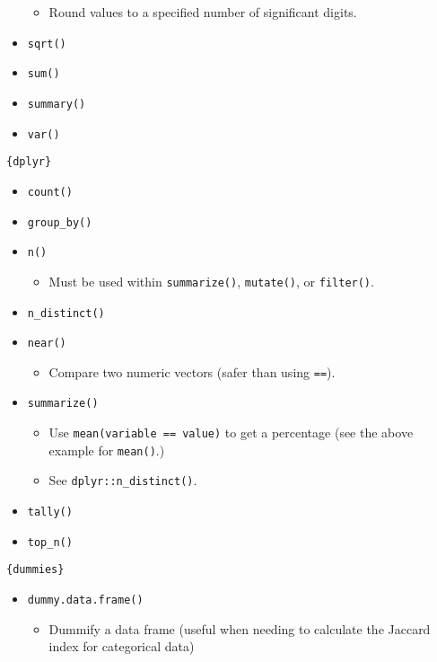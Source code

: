 \documentclass[
]{book}
\providecommand{\tightlist}{%
  \setlength{\itemsep}{0pt}\setlength{\parskip}{0pt}}
\begin{document}
\begin{itemize}
  \begin{itemize}
  \tightlist
  \item
    Round values to a specified number of significant digits.
  \end{itemize}
\item
  \texttt{sqrt()}
\item
  \texttt{sum()}
\item
  \texttt{summary()}
\item
  \texttt{var()}
\end{itemize}

\texttt{\{dplyr\}}

\begin{itemize}
\tightlist
\item
  \texttt{count()}
\item
  \texttt{group\_by()}
\item
  \texttt{n()}

  \begin{itemize}
  \tightlist
  \item
    Must be used within \texttt{summarize()}, \texttt{mutate()}, or \texttt{filter()}.
  \end{itemize}
\item
  \texttt{n\_distinct()}
\item
  \texttt{near()}

  \begin{itemize}
  \tightlist
  \item
    Compare two numeric vectors (safer than using \texttt{==}).
  \end{itemize}
\item
  \texttt{summarize()}

  \begin{itemize}
  \tightlist
  \item
    Use \texttt{mean(variable\ ==\ value)} to get a percentage (see the above example for \texttt{mean()}.)
  \item
    See \texttt{dplyr::n\_distinct()}.
  \end{itemize}
\item
  \texttt{tally()}
\item
  \texttt{top\_n()}
\end{itemize}

\texttt{\{dummies\}}

\begin{itemize}
\tightlist
\item
  \texttt{dummy.data.frame()}

  \begin{itemize}
  \tightlist
  \item
    Dummify a data frame (useful when needing to calculate the Jaccard index for categorical data)
  \end{itemize}
\end{itemize}
\end{document}
